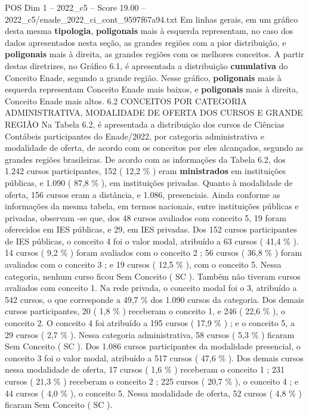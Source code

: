 \begin{textsample}{POS Dim 1 – 2022\_c5 – Score 19.00 – 2022\_c5/enade\_2022\_ci\_cont\_9597f67a94.txt}
Em linhas gerais, em um gráfico desta mesma \textbf{tipologia}, \textbf{poligonais} mais à esquerda representam, no caso dos dados apresentados nesta seção, as grandes regiões com a pior distribuição, e \textbf{poligonais} mais à direita, as grandes regiões com os melhores conceitos.
A partir destas diretrizes, no Gráfico 6.1, é apresentada a distribuição \textbf{cumulativa} do Conceito Enade, segundo a grande região.
Nesse gráfico, \textbf{poligonais} mais à esquerda representam Conceito Enade mais baixos, e \textbf{poligonais} mais à direita, Conceito Enade mais altos. 6.2 CONCEITOS POR CATEGORIA ADMINISTRATIVA, MODALIDADE DE OFERTA DOS CURSOS E GRANDE REGIÃO Na Tabela 6.2, é apresentada a distribuição dos cursos de Ciências Contábeis participantes do Enade/2022, por categoria administrativa e modalidade de oferta, de acordo com os conceitos por eles alcançados, segundo as grandes regiões brasileiras.
De acordo com as informações da Tabela 6.2, dos 1.242 cursos participantes, 152 ( 12,2 \% ) eram \textbf{ministrados} em instituições públicas, e 1.090 ( 87,8 \% ), em instituições privadas.
Quanto à modalidade de oferta, 156 cursos eram a distância, e 1.086, presenciais.
Ainda conforme as informações da mesma tabela, em termos nacionais, entre instituições públicas e privadas, observam -se que, dos 48 cursos avaliados com conceito 5, 19 foram oferecidos em IES públicas, e 29, em IES privadas.
Dos 152 cursos participantes de IES públicas, o conceito 4 foi o valor modal, atribuído a 63 cursos ( 41,4 \% ). 14 cursos ( 9,2 \% ) foram avaliados com o conceito 2 ; 56 cursos ( 36,8 \% ) foram avaliados com o conceito 3 ; e 19 cursos ( 12,5 \% ), com o conceito 5.
Nessa categoria, nenhum curso ficou Sem Conceito ( SC ).
Também não tiveram cursos avaliados com conceito 1.
Na rede privada, o conceito modal foi o 3, atribuído a 542 cursos, o que corresponde a 49,7 \% dos 1.090 cursos da categoria.
Dos demais cursos participantes, 20 ( 1,8 \% ) receberam o conceito 1, e 246 ( 22,6 \% ), o conceito 2.
O conceito 4 foi atribuído a 195 cursos ( 17,9 \% ) ; e o conceito 5, a 29 cursos ( 2,7 \% ).
Nessa categoria administrativa, 58 cursos ( 5,3 \% ) ficaram Sem Conceito ( SC ).
Dos 1.086 cursos participantes da modalidade presencial, o conceito 3 foi o valor modal, atribuído a 517 cursos ( 47,6 \% ).
Dos demais cursos nessa modalidade de oferta, 17 cursos ( 1,6 \% ) receberam o conceito 1 ; 231 cursos ( 21,3 \% ) receberam o conceito 2 ; 225 cursos ( 20,7 \% ), o conceito 4 ; e 44 cursos ( 4,0 \% ), o conceito 5.
Nessa modalidade de oferta, 52 cursos ( 4,8 \% ) ficaram Sem Conceito ( SC ).

\end{textsample}
